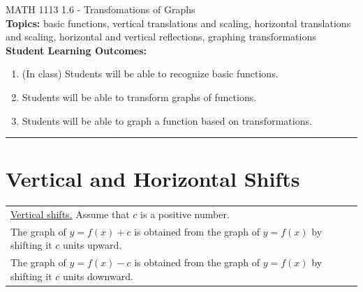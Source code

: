 \documentclass[11pt]{article}
\begin{document}
\noindent MATH 1113   \hfill 1.6 - Transfomations of Graphs\\



\noindent \textbf{Topics:}  basic functions, vertical translations and scaling, horizontal translations and scaling, horizontal and vertical reflections, graphing transformations\\

\noindent \textbf{Student Learning Outcomes:}
\begin{enumerate}
\item (In class) Students will be able to recognize basic functions.
\item Students will be able to transform graphs of functions.
\item Students will be able to graph a function based on transformations.
\end{enumerate}

\hrule 
\vspace{5mm}


\section{Vertical and Horizontal Shifts}
\hspace{-.4in} \begin{tabular}{| l |} \hline \underline{Vertical shifts.} Assume that $c$ is a positive number. \\
The graph of $y = f(x)+c$ is obtained from the graph of $y=f(x)$ by shifting it $c$ units upward. \\
The graph of $y = f(x)-c$ is obtained from the graph of $y=f(x)$ by shifting it $c$ units downward.
 \\ \hline
\end{tabular}
\end{document}
